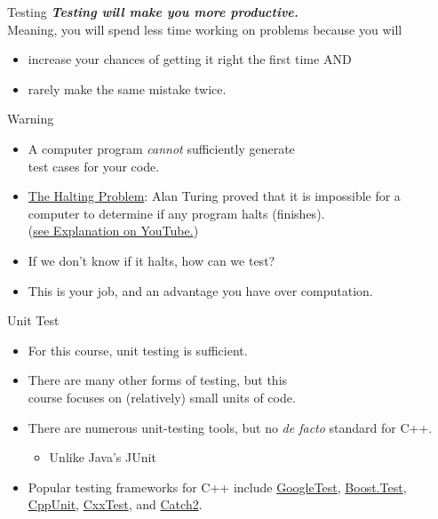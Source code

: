 \documentclass[14pt,aspectratio=1610]{beamer}
\begin{document}
\begin{frame}{Testing}
\textbf{\large\textit{Testing will make you more productive.}}\\[1em]
Meaning, you will spend less time working on problems because you will\textellipsis{}
\begin{itemize}
\item
  increase your chances of getting it right the first time AND
\item
  rarely make the same mistake twice.
\end{itemize}
\end{frame}

\begin{frame}{Warning}
\begin{itemize}[<+->]
\item A computer program \textit{cannot} sufficiently generate \\test cases for your code.
\item \href{https://en.wikipedia.org/wiki/Halting_problem}{The Halting Problem}: Alan Turing proved that it is impossible for a computer to determine if any program halts (finishes).\\
(\href{https://youtu.be/92WHN-pAFCs?t=14}{see Explanation on YouTube.})
\item If we don't know if it halts, how can we test?
\item This is your job, and an advantage you have over computation.
\end{itemize}
\end{frame}

\begin{frame}{Unit Test}
\begin{itemize}
\item
  For this course, unit testing is sufficient.
\item
  There are many other forms of testing, but this\\ course focuses on (relatively) small units of code.
\item
  There are numerous unit-testing tools, but no \textit{de facto} standard for C++.
  \begin{itemize}
  \item Unlike Java's JUnit
  \end{itemize}
\item
  Popular testing frameworks for C++ include \href{https://google.github.io/googletest/}{GoogleTest}, \href{https://www.boost.org/doc/libs/1_81_0/libs/test/doc/html/index.html}{Boost.Test}, \href{CppUnit}{CppUnit}, \href{https://cxxtest.com/}{CxxTest}, and \href{https://github.com/catchorg/Catch2}{Catch2}.
\end{itemize}
\end{frame}
\end{document}
